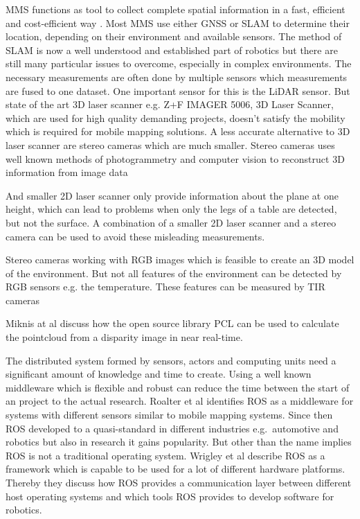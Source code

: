 \ac{MMS} functions as tool to collect complete spatial information in a fast, efficient and cost-efficient way \cite{El-Sheimy2005}.
Most \ac{MMS} use either \ac{GNSS} or \ac{SLAM} to determine their location, depending on their environment and available sensors.
The method of \ac{SLAM} is now a well understood and established part of robotics but there are still many particular issues to overcome, especially in complex environments\cite{durrant-Whyte2006}.
The necessary measurements are often done by multiple sensors which measurements are fused to one dataset.
One important sensor for this is the \ac{LiDAR} sensor.
But state of the art 3D laser scanner e.g. Z+F IMAGER\circledR{} 5006, 3D Laser Scanner, which are used for high quality demanding projects\cite{Abmayr_calibrationand}, doesn't satisfy the mobility which is required for mobile mapping solutions.
A less accurate alternative to 3D laser scanner are stereo cameras which are much smaller.
Stereo cameras uses well known methods of photogrammetry and computer vision to reconstruct 3D information from image data\cite{dagstuhl-11-mayer}\cite{Pollefeys07}

And smaller 2D laser scanner only provide information about the plane at one height, which can lead to problems when only the legs of a table are detected, but not the surface.
A combination of a smaller 2D laser scanner and a stereo camera can be used to avoid these misleading measurements\cite{DBLP:journals/jise/LinCDW12}.

Stereo cameras working with RGB images which is feasible to create an 3D model of the environment.
But not all features of the environment can be detected by RGB sensors e.g. the temperature.
These features can be measured by \ac{TIR} cameras

Miknis at al discuss how the open source library \ac{PCL} can be used to calculate the pointcloud from a disparity image in near real-time\cite{miknis2015}.

The distributed system formed by sensors, actors and computing units need a significant amount of knowledge and time to create.
Using a well known middleware which is flexible and robust can reduce the time between the start of an project to the actual research.
Roalter et al\cite{roalter2011developing} identifies \ac{ROS} as a middleware for systems with different sensors similar to mobile mapping systems.
Since then \ac{ROS} developed to a quasi-standard in different industries e.g.\ automotive and robotics but also in research it gains popularity.
But other than the name implies \ac{ROS} is not a traditional operating system.
Wrigley et al describe \ac{ROS} as a framework which is capable to be used for a lot of different hardware platforms.
Thereby they discuss how \ac{ROS} provides a communication layer between different host operating systems and which tools \ac{ROS} provides to develop software for robotics.\cite{Quigley2009ROSAO}

